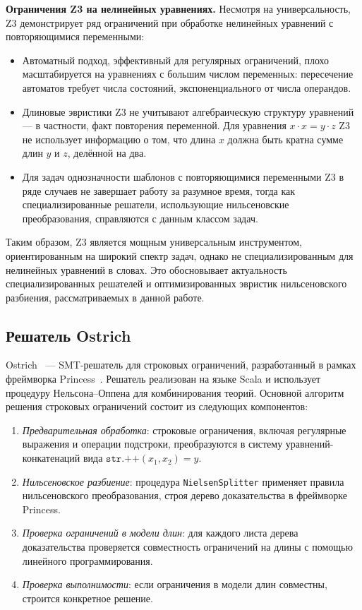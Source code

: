 \documentclass[14pt, russian]{scrartcl}
\begin{document}
\medskip\noindent\textbf{Ограничения Z3 на нелинейных уравнениях.}
Несмотря на универсальность, Z3 демонстрирует ряд ограничений при обработке
нелинейных уравнений с повторяющимися переменными:

\begin{itemize}
\item Автоматный подход, эффективный для регулярных ограничений, плохо
  масштабируется на уравнениях с большим числом переменных: пересечение
  автоматов требует числа состояний, экспоненциального от числа операндов.
\item Длиновые эвристики Z3 не учитывают алгебраическую структуру уравнений ---
  в частности, факт повторения переменной. Для уравнения $x \cdot x = y \cdot z$
  Z3 не использует информацию о том, что длина $x$ должна быть кратна сумме
  длин $y$ и $z$, делённой на два.
\item Для задач однозначности шаблонов с повторяющимися переменными Z3 в ряде
  случаев не завершает работу за разумное время, тогда как специализированные
  решатели, использующие нильсеновские преобразования, справляются с данным
  классом задач.
\end{itemize}

Таким образом, Z3 является мощным универсальным инструментом, ориентированным
на широкий спектр задач, однако не специализированным для нелинейных уравнений
в словах. Это обосновывает актуальность специализированных решателей и
оптимизированных эвристик нильсеновского разбиения, рассматриваемых в
данной работе.

\subsection{Решатель Ostrich}

Ostrich~\cite{chen2022} --- SMT-решатель для строковых ограничений, разработанный в рамках
фреймворка Princess~\cite{ruemmer2008}. Решатель реализован на языке Scala и использует
процедуру Нельсона--Оппена для комбинирования теорий. Основной алгоритм решения
строковых ограничений состоит из следующих компонентов:

\begin{enumerate}
\item \emph{Предварительная обработка}: строковые ограничения, включая регулярные
  выражения и операции подстроки, преобразуются в систему уравнений-конкатенаций вида
  $\texttt{str.++}(x_1, x_2) = y$.
\item \emph{Нильсеновское разбиение}: процедура \texttt{NielsenSplitter} применяет
  правила нильсеновского преобразования, строя дерево доказательства в фреймворке
  Princess.
\item \emph{Проверка ограничений в модели длин}: для каждого листа дерева доказательства
  проверяется совместность ограничений на длины с помощью линейного программирования.
\item \emph{Проверка выполнимости}: если ограничения в модели длин совместны, строится
  конкретное решение.
\end{enumerate}
\end{document}
